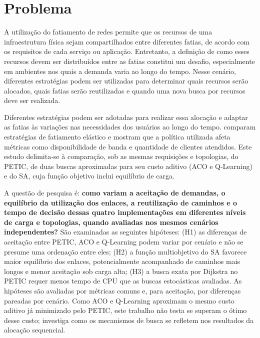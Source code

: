 \section{Problema}

A utilização do fatiamento de redes permite que os recursos de uma infraestrutura física sejam compartilhados entre diferentes fatias, de acordo com os requisitos de cada serviço ou aplicação. Entretanto, a definição de como esses recursos devem ser distribuídos entre as fatias constitui um desafio, especialmente em ambientes nos quais a demanda varia ao longo do tempo. Nesse cenário, diferentes estratégias podem ser utilizadas para determinar quais recursos serão alocados, quais fatias serão reutilizadas e quando uma nova busca por recursos deve ser realizada.

Diferentes estratégias podem ser adotadas para realizar essa alocação e adaptar as fatias às variações nas necessidades dos usuários ao longo do tempo.  comparam estratégias de fatiamento elástico e mostram que a política utilizada afeta métricas como disponibilidade de banda e quantidade de clientes atendidos. Este estudo delimita-se à comparação, sob as mesmas requisições e topologias, do PETIC, de duas buscas aproximadas para seu custo aditivo (ACO e Q-Learning) e do SA, cuja função objetivo inclui equilíbrio de carga.

A questão de pesquisa é: \textbf{como variam a aceitação de demandas, o equilíbrio da utilização dos enlaces, a reutilização de caminhos e o tempo de decisão dessas quatro implementações em diferentes níveis de carga e topologias, quando avaliadas nos mesmos cenários independentes?} São examinadas as seguintes hipóteses: (H1) as diferenças de aceitação entre PETIC, ACO e Q-Learning podem variar por cenário e não se presume uma ordenação entre eles; (H2) a função multiobjetivo do SA favorece maior equilíbrio dos enlaces, potencialmente acompanhado de caminhos mais longos e menor aceitação sob carga alta; (H3) a busca exata por Dijkstra no PETIC requer menos tempo de CPU que as buscas estocásticas avaliadas. As hipóteses são avaliadas por métricas comuns e, para aceitação, por diferenças pareadas por cenário. Como ACO e Q-Learning aproximam o mesmo custo aditivo já minimizado pelo PETIC, este trabalho não testa se superam o ótimo desse custo; investiga como os mecanismos de busca se refletem nos resultados da alocação sequencial.
